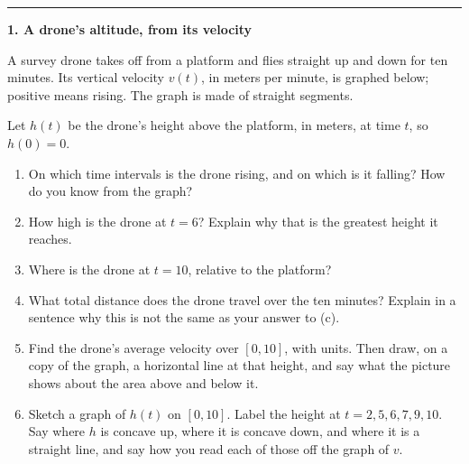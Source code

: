 \documentclass[11pt]{article}
\newcommand{\gridxy}[4]{%
  \foreach \gX in {#1,...,#2} \draw[gray!25] (\gX,#3) -- (\gX,#4);
  \foreach \gY in {#3,...,#4} \draw[gray!25] (#1,\gY) -- (#2,\gY);}
\newcommand{\prob}[1]{\medskip\noindent\textbf{\large #1}\par\smallskip}
\begin{document}
\bigskip\hrule\bigskip
\prob{1. A drone's altitude, from its velocity}
A survey drone takes off from a platform and flies straight up and down for ten minutes.
Its vertical velocity $v(t)$, in meters per minute, is graphed below; positive means rising.
The graph is made of straight segments.
\smallskip
\begin{center}
\end{center}
Let $h(t)$ be the drone's height above the platform, in meters, at time $t$, so $h(0)=0$.
\begin{enumerate}
\item On which time intervals is the drone rising, and on which is it falling? How do you know from the graph?

\item How high is the drone at $t=6$? Explain why that is the greatest height it reaches.

\item Where is the drone at $t=10$, relative to the platform?

\item What total distance does the drone travel over the ten minutes? Explain in a sentence why this is not the same as your answer to (c).

\item Find the drone's average velocity over $[0,10]$, with units. Then draw, on a copy of the graph, a horizontal line at that height, and say what the picture shows about the area above and below it.

\item Sketch a graph of $h(t)$ on $[0,10]$. Label the height at $t=2,5,6,7,9,10$. Say where $h$ is concave up, where it is concave down, and where it is a straight line, and say how you read each of those off the graph of $v$.

\end{enumerate}
\end{document}
